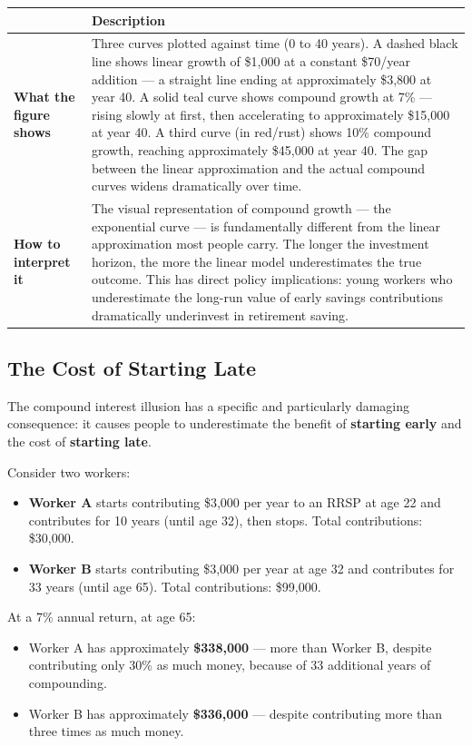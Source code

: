 \documentclass[12pt, letterpaper]{article}
\begin{document}
\begin{table}[H]
\centering
\small
\begin{tabularx}{\linewidth}{lY}
\toprule
 & Description \\
\midrule
\textbf{What the figure shows} & Three curves plotted against time (0 to 40 years). A dashed black line shows linear growth of \$1,000 at a constant \$70/year addition --- a straight line ending at approximately \$3,800 at year 40. A solid teal curve shows compound growth at 7\% --- rising slowly at first, then accelerating to approximately \$15,000 at year 40. A third curve (in red/rust) shows 10\% compound growth, reaching approximately \$45,000 at year 40. The gap between the linear approximation and the actual compound curves widens dramatically over time. \\
\textbf{How to interpret it} & The visual representation of compound growth --- the exponential curve --- is fundamentally different from the linear approximation most people carry. The longer the investment horizon, the more the linear model underestimates the true outcome. This has direct policy implications: young workers who underestimate the long-run value of early savings contributions dramatically underinvest in retirement saving. \\
\bottomrule
\end{tabularx}
\end{table}



\subsection{The Cost of Starting Late}


The compound interest illusion has a specific and particularly damaging consequence: it causes people to underestimate the benefit of \textbf{starting early} and the cost of \textbf{starting late}.

Consider two workers:
\begin{itemize}
\item \textbf{Worker A} starts contributing \$3,000 per year to an RRSP at age 22 and contributes for 10 years (until age 32), then stops. Total contributions: \$30,000.
\item \textbf{Worker B} starts contributing \$3,000 per year at age 32 and contributes for 33 years (until age 65). Total contributions: \$99,000.
\end{itemize}

At a 7\% annual return, at age 65:
\begin{itemize}
\item Worker A has approximately \textbf{\$338,000} --- more than Worker B, despite contributing only 30\% as much money, because of 33 additional years of compounding.
\item Worker B has approximately \textbf{\$336,000} --- despite contributing more than three times as much money.
\end{itemize}
\end{document}
